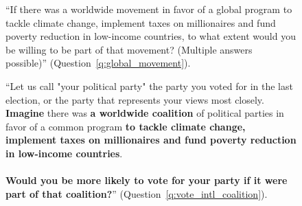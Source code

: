 \begin{figure}[h!]
    \caption[Willingness to participate in a global movement for sustainable development]{``If there was a worldwide movement in favor of a global program to tackle climate change, implement taxes on millionaires and fund poverty reduction in low-income countries, to what extent would you be willing to be part of that movement? (Multiple answers possible)'' (Question~\ref{q:global_movement}).
    }\label{fig:global_movement}
\end{figure}

\begin{figure}[h!]
    \caption[Would vote for a party in a global coalition for sustainable development]{``Let us call "your political party" the party you voted for in the last election, or the party that represents your views most closely.~\\\textbf{Imagine }there was \textbf{a worldwide coalition} of political parties in favor of a common program \textbf{to tackle climate change, implement taxes on millionaires and fund poverty reduction in low-income countries}.~\\\\\textbf{Would you be more likely to vote for your party if it were part of that coalition?}'' (Question~\ref{q:vote_intl_coalition}).
    }\label{fig:vote_intl_coalition}
\end{figure}

